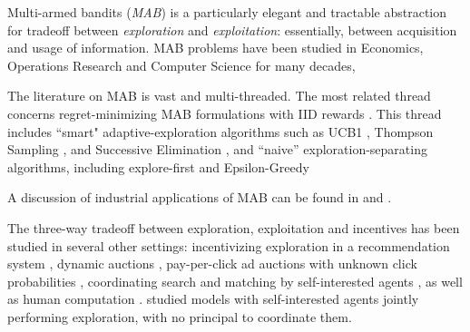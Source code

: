  Multi-armed bandits (\emph{MAB}) is a particularly elegant and tractable abstraction for tradeoff between \emph{exploration} and \emph{exploitation}: essentially, between acquisition and usage of information. MAB problems have been studied in Economics, Operations Research and Computer Science for many decades,  

The literature on MAB is vast and multi-threaded. The most related
thread concerns regret-minimizing MAB formulations with IID rewards
\citep{Lai-Robbins-85,bandits-ucb1}. This thread includes ``smart" adaptive-exploration
algorithms such as UCB1
\citep{bandits-ucb1}, Thompson Sampling \citep{TS-survey-FTML18}, and Successive Elimination
\citep{EvenDar-icml06}, and ``naive'' exploration-separating algorithms, including explore-first and
Epsilon-Greedy 


A discussion of industrial applications of MAB can be found in \citep{DS-arxiv} and \citep[Chapter 8]{slivkins-MABbook}. 

The three-way tradeoff between exploration, exploitation and incentives has been studied in several other settings:
incentivizing exploration in a recommendation system
    \citep[\eg][]{Che-13,Frazier-ec14,Kremer-JPE14,ICexploration-ec15,Bimpikis-exploration-ms17,Bahar-ec16,Jieming-unbiased18},
dynamic auctions
    \cite[\eg][]{AtheySegal-econometrica13,DynPivot-econometrica10,Kakade-pivot-or13},
pay-per-click ad auctions with unknown click probabilities
    \cite[\eg][]{MechMAB-ec09,DevanurK09,Transform-ec10-jacm},
coordinating search and matching by self-interested agents
    \citep{Bobby-Glen-ec16},
as well as human computation
    \cite[\eg][]{RepeatedPA-ec14,Ghosh-itcs13,Krause-www13}.
\citet{Bolton-econometrica99,Keller-econometrica05,Johari-ec12} studied models with self-interested agents jointly performing exploration, with no principal to coordinate them.

